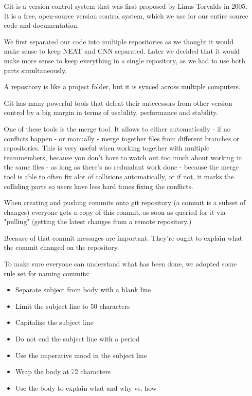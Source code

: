 Git is a version control system that was first proposed by Linus Torvalds in 2005. \cite{Torvalds} \\
It is a free, open-source version control system, which we use for our entire source code and documentation.

We first separated our code into multiple repositories \cite{gitrepo} as we thought it would make sense to keep NEAT and CNN separated. Later we decided that it would make more sense to keep everything in a single repository, as we had to use both parts simultaneously.

A repository is like a project folder, but it is synced across multiple computers.

Git has many powerful tools that defeat their antecessors from other version control by a big margin in terms of usability, performance and stability.

One of these tools is the merge tool. It allows to either automatically - if no conflicts happen - or manually - merge together files from different branches or repositories. This is very useful when working together with multiple teammembers, because you don't have to watch out too much about working in the same files - as long as there's no redundant work done - because the merge tool is able to often fix alot of collisions automatically, or if not, it marks the colliding parts so users have less hard times fixing the conflicts.

When creating and pushing commits onto git repository (a commit is a subset of changes) everyone gets a copy of this commit, as soon as queried for it via "pulling" (getting the latest changes from a remote repository.)

Because of that commit messages are important. They're ought to explain what the commit changed on the repository.

To make sure everyone can understand what has been done, we adopted some rule set for naming commits\cite{Beams2014}:

\begin{itemize}
	\item Separate subject from body with a blank line
	\item Limit the subject line to 50 characters
	\item Capitalize the subject line
	\item Do not end the subject line with a period
	\item Use the imperative mood in the subject line
	\item Wrap the body at 72 characters
	\item Use the body to explain what and why vs. how
\end{itemize}













\cite{Torvalds}